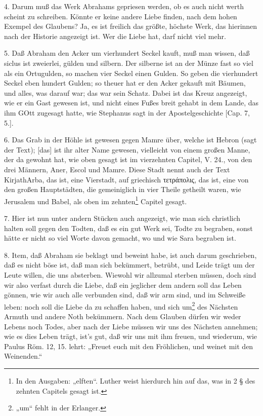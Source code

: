 4. Darum muß das Werk Abrahams gepriesen werden, ob es auch nicht werth scheint zu schreiben. Könnte er keine andere Liebe finden, nach dem hohen Exempel des Glaubens? Ja, es ist freilich das größte, höchste Werk, das hierinnen nach der Historie angezeigt ist. Wer die Liebe hat, darf nicht viel mehr.

5. Daß Abraham den Acker um vierhundert Seckel kauft, muß man wissen, daß siclus ist zweierlei, gülden und silbern. Der silberne ist an der Münze fast so viel als ein Ortugulden, so machen vier Seckel einen Gulden. So geben die vierhundert Seckel eben hundert Gulden; so theuer hat er den Acker gekauft mit Bäumen, und alles, was darauf war; das war sein Schatz. Dabei ist das Kreuz angezeigt, wie er ein Gast gewesen ist, und nicht eines Fußes breit gehabt in dem Lande, das ihm GOtt zugesagt hatte, wie Stephanus sagt in der Apostelgeschichte [Cap. 7, 5.].

6. Das Grab in der Höhle ist gewesen gegen Mamre über, welche ist Hebron (sagt der Text); [das] ist ihr alter Name gewesen, vielleicht von einem großen Manne, der da gewohnt hat, wie oben gesagt ist im vierzehnten Capitel, V. 24., von den drei Männern, Aner, Escol und Mamre. Diese Stadt nennt auch der Text KirjathArba, das ist, eine Vierstadt, auf griechisch τετράπολις, das ist, eine von den großen Hauptstädten, die gemeiniglich in vier Theile getheilt waren, wie Jerusalem und Babel, als oben im zehnten\footnote{In den Ausgaben: „elften“. Luther weist hierdurch hin auf das, was in 2 § des zehnten Capitels gesagt ist.} Capitel gesagt.

7. Hier ist nun unter andern Stücken auch angezeigt, wie man sich christlich halten soll gegen den Todten, daß es ein gut Werk sei, Todte zu begraben, sonst hätte er nicht so viel Worte davon gemacht, wo und wie Sara begraben ist.

8. Item, daß Abraham sie beklagt und beweint habe, ist auch darum geschrieben, daß es nicht böse ist, daß man sich bekümmert, betrübt, und Leide trägt um der Leute willen, die uns absterben. Wiewohl wir allzumal sterben müssen, doch sind wir also verfast durch die Liebe, daß ein jeglicher dem andern soll das Leben gönnen, wie wir auch alle verbunden sind, daß wir arm sind, und im Schweiße leben: noch soll die Liebe da zu schaffen haben, und sich um\footnote{„um“ fehlt in der Erlanger.} des Nächsten Armuth und andere Noth bekümmern. Nach dem Glauben dürfen wir weder Lebens noch Todes, aber nach der Liebe müssen wir uns des Nächsten annehmen; wie es dies Leben trägt,
ist’s gut, daß wir uns mit ihm freuen, und wiederum, wie Paulus Röm. 12, 15. lehrt: „Freuet euch mit den Fröhlichen, und weinet mit den Weinenden.“

